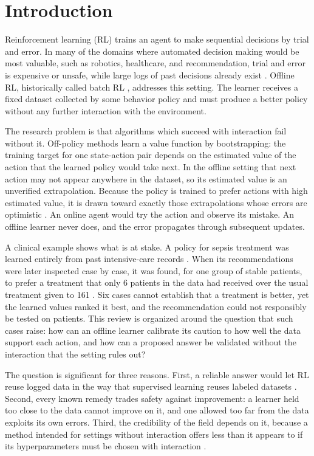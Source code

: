 \documentclass[conference]{IEEEtran}
\begin{document}
\section{Introduction}
Reinforcement learning (RL) trains an agent to make sequential decisions by trial and error. In many of the domains where automated decision making would be most valuable, such as robotics, healthcare, and recommendation, trial and error is expensive or unsafe, while large logs of past decisions already exist \cite{levine2020tutorial,dulacarnold2021challenges}. Offline RL, historically called batch RL \cite{lange2012batch}, addresses this setting. The learner receives a fixed dataset collected by some behavior policy and must produce a better policy without any further interaction with the environment.

The research problem is that algorithms which succeed with interaction fail without it. Off-policy methods learn a value function by bootstrapping: the training target for one state-action pair depends on the estimated value of the action that the learned policy would take next. In the offline setting that next action may not appear anywhere in the dataset, so its estimated value is an unverified extrapolation. Because the policy is trained to prefer actions with high estimated value, it is drawn toward exactly those extrapolations whose errors are optimistic \cite{fujimoto2019bcq,kumar2019bear}. An online agent would try the action and observe its mistake. An offline learner never does, and the error propagates through subsequent updates.

A clinical example shows what is at stake. A policy for sepsis treatment was learned entirely from past intensive-care records \cite{komorowski2018clinician}. When its recommendations were later inspected case by case, it was found, for one group of stable patients, to prefer a treatment that only 6 patients in the data had received over the usual treatment given to 161 \cite{ji2021trajectory}. Six cases cannot establish that a treatment is better, yet the learned values ranked it best, and the recommendation could not responsibly be tested on patients. This review is organized around the question that such cases raise: how can an offline learner calibrate its caution to how well the data support each action, and how can a proposed answer be validated without the interaction that the setting rules out?

The question is significant for three reasons. First, a reliable answer would let RL reuse logged data in the way that supervised learning reuses labeled datasets \cite{levine2020tutorial}. Second, every known remedy trades safety against improvement: a learner held too close to the data cannot improve on it, and one allowed too far from the data exploits its own errors. Third, the credibility of the field depends on it, because a method intended for settings without interaction offers less than it appears to if its hyperparameters must be chosen with interaction \cite{paine2020hyperparameter,kurenkov2022budget}.
\end{document}
